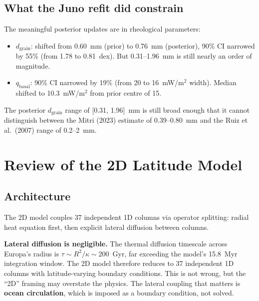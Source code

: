\documentclass[11pt,a4paper]{article}
\begin{document}
\subsection{What the Juno refit did constrain}

The meaningful posterior updates are in rheological parameters:
\begin{itemize}[leftmargin=2em]
\item $d_\mathrm{grain}$: shifted from 0.60~mm (prior) to 0.76~mm
      (posterior), 90\% CI narrowed by 55\% (from 1.78 to 0.81~dex).
      But 0.31--1.96~mm is still nearly an order of magnitude.
\item $q_\mathrm{basal}$: 90\% CI narrowed by 19\% (from 20 to 16~mW/m$^2$
      width). Median shifted to 10.3~mW/m$^2$ from prior centre of 15.
\end{itemize}

\begin{warning}
The posterior $d_\mathrm{grain}$ range of [0.31, 1.96]~mm is still
broad enough that it cannot distinguish between the Mitri (2023) estimate
of 0.39--0.80~mm and the Ruiz et al.\ (2007) range of 0.2--2~mm.
\end{warning}

\section{Review of the 2D Latitude Model}

\subsection{Architecture}

The 2D model couples 37 independent 1D columns via operator splitting:
radial heat equation first, then explicit lateral diffusion between columns.

\begin{warning}
\textbf{Lateral diffusion is negligible.} The thermal diffusion timescale
across Europa's radius is $\tau \sim R^2/\kappa \sim 200$~Gyr, far exceeding
the model's 15.8~Myr integration window. The 2D model therefore reduces to
37 independent 1D columns with latitude-varying boundary conditions. This is
not wrong, but the ``2D'' framing may overstate the physics. The lateral
coupling that matters is \textbf{ocean circulation}, which is imposed as a
boundary condition, not solved.
\end{warning}
\end{document}
